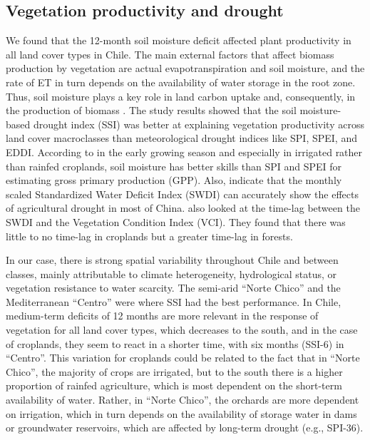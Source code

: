 \documentclass[
  authoryear,
  preprint,
  3p,
  onecolumn]{elsarticle}
\begin{document}
\hypertarget{vegetation-productivity-and-drought}{%
\subsection{Vegetation productivity and
drought}\label{vegetation-productivity-and-drought}}

We found that the 12-month soil moisture deficit affected plant
productivity in all land cover types in Chile. The main external factors
that affect biomass production by vegetation are actual
evapotranspiration and soil moisture, and the rate of ET in turn depends
on the availability of water storage in the root zone. Thus, soil
moisture plays a key role in land carbon uptake and, consequently, in
the production of biomass \citep{Humphrey2021}. The study results showed
that the soil moisture-based drought index (SSI) was better at
explaining vegetation productivity across land cover macroclasses than
meteorological drought indices like SPI, SPEI, and EDDI. According to
\citep{Chatterjee2022} in the early growing season and especially in
irrigated rather than rainfed croplands, soil moisture has better skills
than SPI and SPEI for estimating gross primary production (GPP). Also,
\citet{Zhou2021} indicate that the monthly scaled Standardized Water
Deficit Index (SWDI) can accurately show the effects of agricultural
drought in most of China. \citet{Nicolai2017} also looked at the
time-lag between the SWDI and the Vegetation Condition Index (VCI). They
found that there was little to no time-lag in croplands but a greater
time-lag in forests.

In our case, there is strong spatial variability throughout Chile and
between classes, mainly attributable to climate heterogeneity,
hydrological status, or vegetation resistance to water scarcity. The
semi-arid ``Norte Chico'' and the Mediterranean ``Centro'' were where
SSI had the best performance. In Chile, medium-term deficits of 12
months are more relevant in the response of vegetation for all land
cover types, which decreases to the south, and in the case of croplands,
they seem to react in a shorter time, with six months (SSI-6) in
``Centro''. This variation for croplands could be related to the fact
that in ``Norte Chico'', the majority of crops are irrigated, but to the
south there is a higher proportion of rainfed agriculture, which is most
dependent on the short-term availability of water. Rather, in ``Norte
Chico'', the orchards are more dependent on irrigation, which in turn
depends on the availability of storage water in dams or groundwater
reservoirs, which are affected by long-term drought (e.g., SPI-36).
\end{document}
